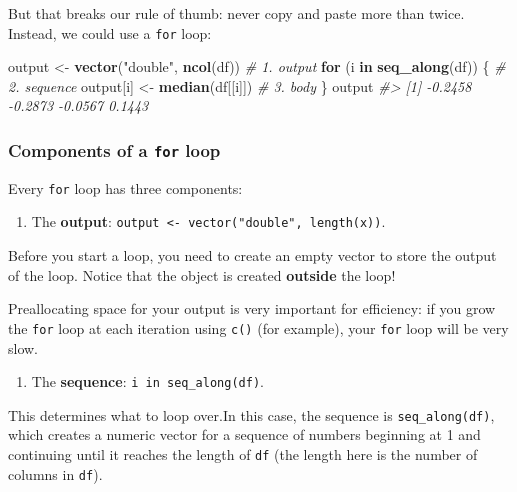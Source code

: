 \documentclass[]{book}
\newenvironment{Shaded}{\begin{snugshade}}{\end{snugshade}}
\newcommand{\KeywordTok}[1]{\textcolor[rgb]{0.13,0.29,0.53}{\textbf{#1}}}
\newcommand{\StringTok}[1]{\textcolor[rgb]{0.31,0.60,0.02}{#1}}
\newcommand{\CommentTok}[1]{\textcolor[rgb]{0.56,0.35,0.01}{\textit{#1}}}
\newcommand{\ControlFlowTok}[1]{\textcolor[rgb]{0.13,0.29,0.53}{\textbf{#1}}}
\newcommand{\NormalTok}[1]{#1}
\providecommand{\tightlist}{%
  \setlength{\itemsep}{0pt}\setlength{\parskip}{0pt}}
\begin{document}
But that breaks our rule of thumb: never copy and paste more than twice.
Instead, we could use a \texttt{for} loop:

\begin{Shaded}
\begin{Highlighting}[]
\NormalTok{output <-}\StringTok{ }\KeywordTok{vector}\NormalTok{(}\StringTok{"double"}\NormalTok{, }\KeywordTok{ncol}\NormalTok{(df))  }\CommentTok{# 1. output}
\ControlFlowTok{for}\NormalTok{ (i }\ControlFlowTok{in} \KeywordTok{seq_along}\NormalTok{(df)) \{            }\CommentTok{# 2. sequence}
\NormalTok{  output[i] <-}\StringTok{ }\KeywordTok{median}\NormalTok{(df[[i]])        }\CommentTok{# 3. body}
\NormalTok{\}}
\NormalTok{output}
\CommentTok{#> [1] -0.2458 -0.2873 -0.0567  0.1443}
\end{Highlighting}
\end{Shaded}

\subsubsection*{\texorpdfstring{Components of a \texttt{for}
loop}{Components of a for loop}}\label{components-of-a-for-loop}

Every \texttt{for} loop has three components:

\begin{enumerate}
\def\labelenumi{\arabic{enumi}.}
\tightlist
\item
  The \textbf{output}:
  \texttt{output\ \textless{}-\ vector("double",\ length(x))}.
\end{enumerate}

Before you start a loop, you need to create an empty vector to store the
output of the loop. Notice that the object is created \textbf{outside}
the loop!

Preallocating space for your output is very important for efficiency: if
you grow the \texttt{for} loop at each iteration using \texttt{c()} (for
example), your \texttt{for} loop will be very slow.

\begin{enumerate}
\def\labelenumi{\arabic{enumi}.}
\setcounter{enumi}{1}
\tightlist
\item
  The \textbf{sequence}: \texttt{i\ in\ seq\_along(df)}.
\end{enumerate}

This determines what to loop over.In this case, the sequence is
\texttt{seq\_along(df)}, which creates a numeric vector for a sequence
of numbers beginning at 1 and continuing until it reaches the length of
\texttt{df} (the length here is the number of columns in \texttt{df}).
\end{document}

